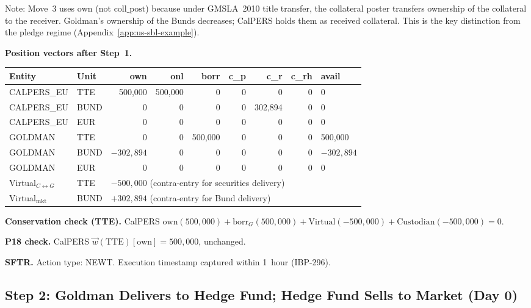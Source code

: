 \documentclass[11pt,a4paper]{article}
\begin{document}
Note: Move~3 uses $\mathrm{own}$ (not $\mathrm{coll\_post}$) because under GMSLA~2010 title transfer, the collateral poster transfers ownership of the collateral to the receiver. Goldman's ownership of the Bunds decreases; CalPERS holds them as received collateral. This is the key distinction from the pledge regime (Appendix~\ref{app:us-sbl-example}).

\medskip
\noindent\textbf{Position vectors after Step~1.}

\begin{center}\small
\begin{tabular}{l l r r r r r r l}
\toprule
\textbf{Entity} & \textbf{Unit} & own & onl & borr & c\_p & c\_r & c\_rh & avail \\
\midrule
CALPERS\_EU & TTE & 500{,}000 & 500{,}000 & 0 & 0 & 0 & 0 & 0 \\
CALPERS\_EU & BUND & 0 & 0 & 0 & 0 & 302{,}894 & 0 & 0 \\
CALPERS\_EU & EUR & 0 & 0 & 0 & 0 & 0 & 0 & 0 \\
\midrule
GOLDMAN & TTE & 0 & 0 & 500{,}000 & 0 & 0 & 0 & 500{,}000 \\
GOLDMAN & BUND & $-302{,}894$ & 0 & 0 & 0 & 0 & 0 & $-302{,}894$ \\
GOLDMAN & EUR & 0 & 0 & 0 & 0 & 0 & 0 & 0 \\
\midrule
Virtual$_{C{\leftrightarrow}G}$ & TTE & \multicolumn{7}{l}{$-500{,}000$ (contra-entry for securities delivery)} \\
Virtual$_{\mathrm{mkt}}$ & BUND & \multicolumn{7}{l}{$+302{,}894$ (contra-entry for Bund delivery)} \\
\bottomrule
\end{tabular}
\end{center}

\noindent\textbf{Conservation check (TTE).} CalPERS $\mathrm{own}(500{,}000) + \mathrm{borr}_G(500{,}000) + \text{Virtual}(-500{,}000) + \text{Custodian}(-500{,}000) = 0$. \checkmark

\noindent\textbf{P18 check.} CalPERS $\vec{w}(\text{TTE})[\mathrm{own}] = 500{,}000$, unchanged. \checkmark

\noindent\textbf{SFTR.} Action type: NEWT. Execution timestamp captured within 1~hour (IBP-296).

\subsection{Step 2: Goldman Delivers to Hedge Fund; Hedge Fund Sells to Market (Day 0)}
\label{sec:eu-step2}
\end{document}
